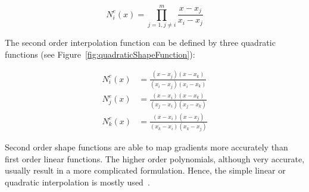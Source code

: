 \begin{equation}
	N_{i}^{e}(x) = \prod_{j=1, j \neq i}^{m}\frac{x-x_{j}}{x_{i}-x_{j}} 
	\label{eqn:higherOrderInterpolationFunction}
\end{equation}

The second order interpolation function can be defined by three quadratic functions (see Figure~\ref{fig:quadraticShapeFunction}):

\begin{eqnarray}
	N_{i}^{e}(x) &= \frac{(x-x_{j})(x-x_{k})}{(x_{i}-x_{j})(x_{i}-x_{k})}\\
	N_{j}^{e}(x) &= \frac{(x-x_{i})(x-x_{k})}{(x_{j}-x_{i})(x_{j}-x_{k})}\\
	N_{k}^{e}(x) &= \frac{(x-x_{i})(x-x_{j})}{(x_{k}-x_{i})(x_{k}-x_{j})}
\end{eqnarray}

Second order shape functions are able to map gradients more accurately than first order linear functions. The higher order polynomials, although very accurate, usually result in a more complicated formulation. Hence, the simple linear or quadratic interpolation is mostly used~\cite{Jin2014}. 

